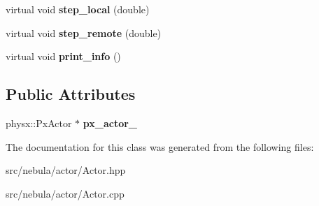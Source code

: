 \begin{DoxyCompactItemize}
\item 
\hypertarget{classneb_1_1Actor_1_1Actor_a04b545da670a47a37b152cfa3444767e}{virtual void {\bfseries step\-\_\-local} (double)}\label{classneb_1_1Actor_1_1Actor_a04b545da670a47a37b152cfa3444767e}

\item 
\hypertarget{classneb_1_1Actor_1_1Actor_a14f9a1b3e60bdad6ae4dfafd6f9580e8}{virtual void {\bfseries step\-\_\-remote} (double)}\label{classneb_1_1Actor_1_1Actor_a14f9a1b3e60bdad6ae4dfafd6f9580e8}

\item 
\hypertarget{classneb_1_1Actor_1_1Actor_ac1c1c4f015ed704b306d3aaa3fa3efc1}{virtual void {\bfseries print\-\_\-info} ()}\label{classneb_1_1Actor_1_1Actor_ac1c1c4f015ed704b306d3aaa3fa3efc1}

\end{DoxyCompactItemize}
\subsection*{\-Public \-Attributes}
\begin{DoxyCompactItemize}
\item 
\hypertarget{classneb_1_1Actor_1_1Actor_a4b5d6b98af98afece2a7f09c1ba7e69c}{physx\-::\-Px\-Actor $\ast$ {\bfseries px\-\_\-actor\-\_\-}}\label{classneb_1_1Actor_1_1Actor_a4b5d6b98af98afece2a7f09c1ba7e69c}

\end{DoxyCompactItemize}


\-The documentation for this class was generated from the following files\-:\begin{DoxyCompactItemize}
\item 
src/nebula/actor/\-Actor.\-hpp\item 
src/nebula/actor/\-Actor.\-cpp\end{DoxyCompactItemize}
